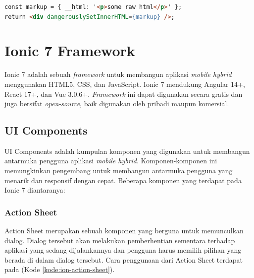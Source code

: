 \begin{lstlisting}[language=HTML, caption=Contoh Potongan Kode dangerouslySetInnerHTML, label=kode:danger-set-inner-html-example]
const markup = { __html: '<p>some raw html</p>' };
return <div dangerouslySetInnerHTML={markup} />;
\end{lstlisting}

\section{\texorpdfstring{Ionic 7 Framework~\cite{ionic-docs}}{Ionic 7 Framework}}
\label{sec:template}
 
 

Ionic 7 adalah sebuah \textit{framework} untuk membangun aplikasi \textit{mobile hybrid} menggunakan HTML5, CSS, dan JavaScript. Ionic 7 mendukung Angular 14+, React 17+, dan Vue 3.0.6+. \textit{Framework} ini dapat digunakan secara gratis dan juga bersifat \textit{open-source}, baik digunakan oleh pribadi maupun komersial.

\subsection{UI Components}
UI Components adalah kumpulan komponen yang digunakan untuk membangun antarmuka pengguna aplikasi \textit{mobile hybrid}. Komponen-komponen ini memungkinkan pengembang untuk membangun antarmuka pengguna yang menarik dan responsif dengan cepat. Beberapa komponen yang terdapat pada Ionic 7 diantaranya:

\subsubsection{Action Sheet}
Action Sheet merupakan sebuah komponen yang berguna untuk memunculkan dialog. Dialog tersebut akan melakukan pemberhentian sementara terhadap aplikasi yang sedang dijalankannya dan pengguna harus memilih pilihan yang berada di dalam dialog tersebut. Cara penggunaan dari Action Sheet terdapat pada (Kode \ref{kode:ion-action-sheet}).

